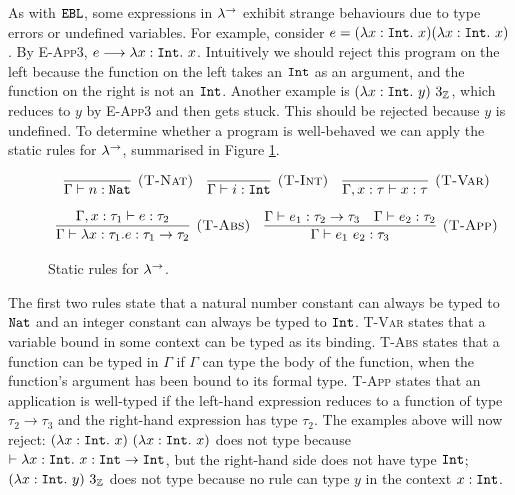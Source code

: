 As with $\mathtt{EBL}$, some expressions in $\lambda^{\rightarrow}$ exhibit strange behaviours due to type errors or undefined variables. For example, consider $e = (\lambda x: \mathtt{Int}.~x) (\lambda x:\mathtt{Int}.~x)$. By \textsc{E-App3}, $e \longrightarrow \lambda x:\mathtt{Int}.~x$. Intuitively we should reject this program on the left because the function on the left takes an $\mathtt{Int}$ as an argument, and the function on the right is not an $\mathtt{Int}$. Another example is $(\lambda x: \mathtt{Int}.~y)~3_{\mathbb{Z}}$, which reduces to $y$ by \textsc{E-App3} and then gets stuck. This should be rejected because $y$ is undefined. To determine whether a program is well-behaved we can apply the static rules for $\lambda^{\rightarrow}$, summarised in Figure \ref{fig:stlc_static_rules}.


\begin{figure}[h]


\[
\begin{array}{c}

\infer[\textsc{(T-Nat)}]
	{\Gamma \vdash n: \Nat}
	{}
	~~~
\infer[\textsc{(T-Int)}]
	{\Gamma \vdash i: \Int}
	{}
~~~
\infer[\textsc{(T-Var)}]
	{\Gamma, x: \tau \vdash x: \tau}
	{} \\[2ex]
	
\infer[\textsc{(T-Abs)}]
	{\Gamma \vdash \lambda x: \tau_1.e : \tau_1 \rightarrow \tau_2}
	{\Gamma, x: \tau_1 \vdash e: \tau_2} 
	~~~
	
\infer[\textsc{(T-App)}]
	{\Gamma \vdash e_1~e_2: \tau_3}
	{\Gamma \vdash e_1: \tau_2 \rightarrow \tau_3 & \Gamma \vdash e_2: \tau_2}

\end{array}
\]


\vspace{-12pt}
\caption{Static rules for $\lambda^{\rightarrow}$.}
\label{fig:stlc_static_rules}
\end{figure}

The first two rules state that a natural number constant can always be typed to $\mathtt{Nat}$ and an integer constant can always be typed to $\mathtt{Int}$. \textsc{T-Var} states that a variable bound in some context can be typed as its binding. \textsc{T-Abs} states that a function can be typed in $\Gamma$ if $\Gamma$ can type the body of the function, when the function's argument has been bound to its formal type. \textsc{T-App} states that an application is well-typed if the left-hand expression reduces to a function of type $\tau_2 \rightarrow \tau_3$ and the right-hand expression has type $\tau_2$. The examples above will now reject: $(\lambda x: \mathtt{Int}.~x)~(\lambda x:\mathtt{Int}.~x)$ does not type because $\vdash \lambda x: \mathtt{Int}.~x : \mathtt{Int} \rightarrow \mathtt{Int}$, but the right-hand side does not have type $\mathtt{Int}$; $(\lambda x: \mathtt{Int}.~y)~3_{\mathbb{Z}}$ does not type because no rule can type $y$ in the context $x: \mathtt{Int}$.

